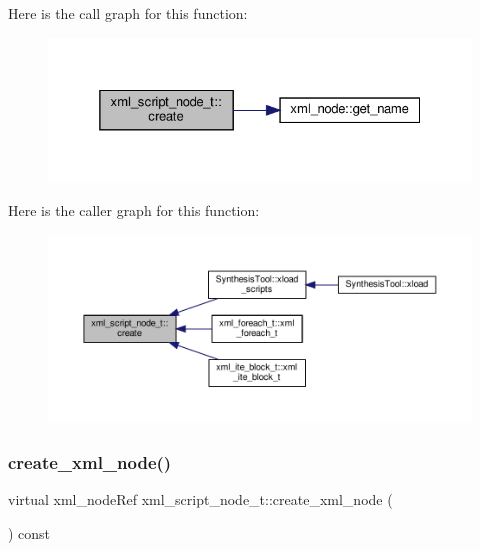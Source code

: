Here is the call graph for this function\+:
\nopagebreak
\begin{figure}[H]
\begin{center}
\leavevmode
\includegraphics[width=325pt]{d6/de5/classxml__script__node__t_aed7d38abc27f6750b763da3ccd7b4b87_cgraph}
\end{center}
\end{figure}
Here is the caller graph for this function\+:
\nopagebreak
\begin{figure}[H]
\begin{center}
\leavevmode
\includegraphics[width=350pt]{d6/de5/classxml__script__node__t_aed7d38abc27f6750b763da3ccd7b4b87_icgraph}
\end{center}
\end{figure}
\mbox{\label{classxml__script__node__t_adaf9c51a079c4617f3845c6133eb477f}} 
\subsubsection{\texorpdfstring{create\+\_\+xml\+\_\+node()}{create\_xml\_node()}}
{\footnotesize\ttfamily virtual xml\+\_\+node\+Ref xml\+\_\+script\+\_\+node\+\_\+t\+::create\+\_\+xml\+\_\+node (\begin{DoxyParamCaption}{ }\end{DoxyParamCaption}) const\hspace{0.3cm}{\ttfamily [pure virtual]}}



